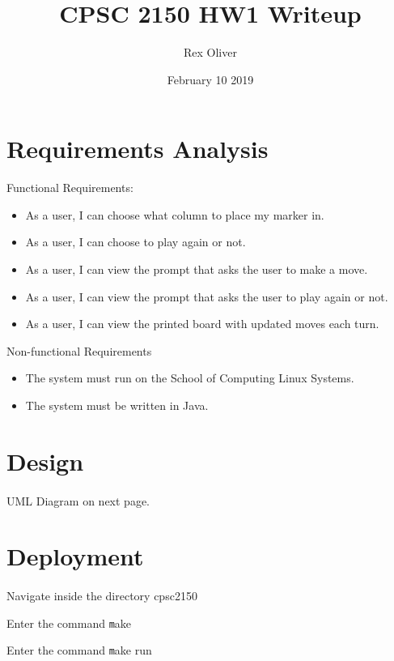\documentclass{article}
\title{CPSC 2150 HW1 Writeup}
\author{Rex Oliver}
\date{February 10 2019}
\begin{document}
\begin{titlepage}
  \maketitle
\end{titlepage}

\section{Requirements Analysis}
Functional Requirements:
\begin{itemize}
  \item As a user, I can choose what column to place my marker in.
  \item As a user, I can choose to play again or not.
  \item As a user, I can view the prompt that asks the user to make a move.
  \item As a user, I can view the prompt that asks the user to play again or
    not.
  \item As a user, I can view the printed board with updated
    moves each turn.
\end{itemize}
Non-functional Requirements
\begin{itemize}
\item The system must run on the School of Computing Linux Systems.
\item The system must be written in Java.
\end{itemize}  

\section{Design}
\paragraph{}
UML Diagram on next page.  


\section{Deployment}
\paragraph{}
Navigate inside the directory cpsc2150 

Enter the command \texttt make

Enter the command \texttt make run
\end{document}
